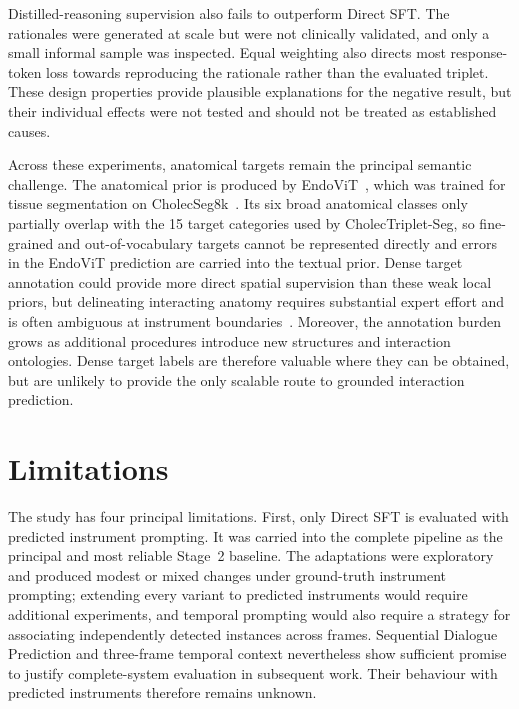 Distilled-reasoning supervision also fails to outperform Direct SFT. The rationales were generated at scale but were not clinically validated, and only a small informal sample was inspected. Equal weighting also directs most response-token loss towards reproducing the rationale rather than the evaluated triplet. These design properties provide plausible explanations for the negative result, but their individual effects were not tested and should not be treated as established causes.

Across these experiments, anatomical targets remain the principal semantic challenge. The anatomical prior is produced by EndoViT~\cite{batic2024endovit}, which was trained for tissue segmentation on CholecSeg8k~\cite{cholecseg8k}. Its six broad anatomical classes only partially overlap with the 15 target categories used by CholecTriplet-Seg, so fine-grained and out-of-vocabulary targets cannot be represented directly and errors in the EndoViT prediction are carried into the textual prior. Dense target annotation could provide more direct spatial supervision than these weak local priors, but delineating interacting anatomy requires substantial expert effort and is often ambiguous at instrument boundaries~\cite{owen2022automated}. Moreover, the annotation burden grows as additional procedures introduce new structures and interaction ontologies. Dense target labels are therefore valuable where they can be obtained, but are unlikely to provide the only scalable route to grounded interaction prediction.

\section{Limitations}
\label{sec:c5:limitations}

The study has four principal limitations. First, only Direct SFT is evaluated with predicted instrument prompting. It was carried into the complete pipeline as the principal and most reliable Stage~2 baseline. The adaptations were exploratory and produced modest or mixed changes under ground-truth instrument prompting; extending every variant to predicted instruments would require additional experiments, and temporal prompting would also require a strategy for associating independently detected instances across frames. Sequential Dialogue Prediction and three-frame temporal context nevertheless show sufficient promise to justify complete-system evaluation in subsequent work. Their behaviour with predicted instruments therefore remains unknown.

